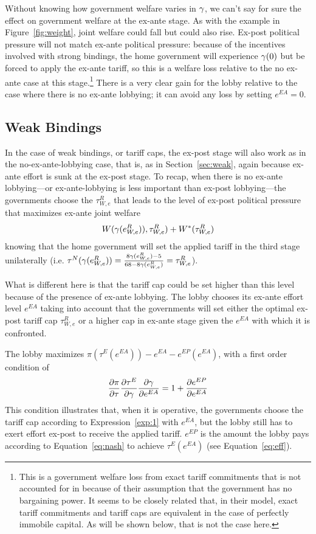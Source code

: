 Without knowing how government welfare varies in $\gamma$, we can't say for sure the effect on government welfare at the ex-ante stage. As with the example in Figure~\ref{fig:weight}, joint welfare could fall but could also rise. Ex-post political pressure will not match ex-ante political pressure: because of the incentives involved with strong bindings, the home government will experience $\gamma(0)$ but be forced to apply the ex-ante tariff, so this is a welfare loss relative to the no ex-ante case at this stage.\footnote{This is a government welfare loss from exact tariff commitments that is not accounted for in \Textcite{mrc2007} because of their assumption that the government has no bargaining power. It seems to be closely related that, in their model,  exact tariff commitments and tariff caps are equivalent in the case of perfectly immobile capital. As will be shown below, that is not the case here.} There is a very clear gain for the lobby relative to the case where there is no ex-ante lobbying; it can avoid any loss by setting $e^{EA}=0$.
				
\subsection{Weak Bindings}
In the case of weak bindings, or tariff caps, the ex-post stage will also work as in the no-ex-ante-lobbying case, that is, as in Section~\ref{sec:weak}, again because ex-ante effort is sunk at the ex-post stage. To recap, when there is no ex-ante lobbying---or ex-ante-lobbying is less important than ex-post lobbying---the governments choose the $\tau^R_{W,e}$ that leads to the level of ex-post political pressure that maximizes ex-ante joint welfare
		\[
		  W(\gamma(e^R_{W,e})),\tau^R_{W,e}) + W^*(\tau^R_{W,e})
		\]
		knowing that the home government will set the applied tariff in the third stage unilaterally (i.e. $\tau^N(\gamma(e^R_{W,e})) = \frac{8\gamma(e^R_{W,e}) - 5}{68 - 8 \gamma(e^R_{W,e})} = \tau^R_{W,e}$).
						
What is different here is that the tariff cap could be set higher than this level because of the presence of ex-ante lobbying. The lobby chooses its ex-ante effort level $e^{EA}$ taking into account that the governments will set either the optimal ex-post tariff cap $\tau^R_{W,e}$ or a higher cap in ex-ante stage given the $e^{EA}$ with which it is confronted.

The lobby maximizes $\pi(\tau^E(e^{EA})) - e^{EA} - e^{EP}(e^{EA})$, with a first order condition of 
	\begin{equation}
	  \frac{\partial \pi}{\partial \tau} \frac{\partial \tau^E}{\partial \gamma} \frac{\partial \gamma}{\partial e^{EA}} = 1 +\frac{\partial e^{EP}}{\partial e^{EA}}
			\label{eq:ea}
	\end{equation}
This condition illustrates that, when it is operative, the governments choose the tariff cap according to Expression~\ref{exp:1} with $e^{EA}$, but the lobby still has to exert effort ex-post to receive the applied tariff. $e^{EP}$ is the amount the lobby pays according to Equation~\ref{eq:nash} to achieve $\tau^E(e^{EA})$ (see Equation~\ref{eq:eff}).

